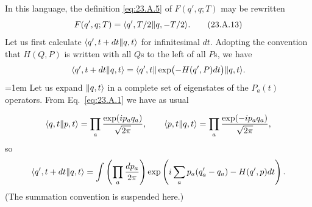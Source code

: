 In this language, the definition \eqref{eq:23.A.5} of $F(q',q;T)$ may be rewritten
\begin{equation}
 F(q',q;T)=\langle q',T/2\Vert q,-T/2\rangle.
 \tag{23.A.13}\label{eq:23.A.13}
\end{equation}
Let us first calculate $\langle q',t+dt\Vert q,t\rangle$ for infinitesimal $dt$. Adopting the convention that $H(Q,P)$ is written with all $Q$s to the left of all $P$s, we have
\[
 \langle q',t+dt\Vert q,t\rangle
 =\langle q',t\rVert\exp\bigl(-H(q',P)dt\bigr)\lVert q,t\rangle.
\]
\begingroup
\emergencystretch=1em
Let us expand $\lVert q,t\rangle$ in a complete set of eigenstates of the $P_a(t)$ operators. From Eq.~\eqref{eq:23.A.1} we have as usual
\par
\endgroup
\[
 \langle q,t\Vert p,t\rangle
 =\prod_a\frac{\exp(ip_aq_a)}{\sqrt{2\pi}},
 \qquad
 \langle p,t\Vert q,t\rangle
 =\prod_a\frac{\exp(-ip_aq_a)}{\sqrt{2\pi}},
\]
so
\[
 \langle q',t+dt\Vert q,t\rangle
 =\int\left(\prod_a\frac{dp_a}{2\pi}\right)
 \exp\left(
 i\sum_a p_a(q'_a-q_a)-H(q',p)dt
 \right).
\]
(The summation convention is suspended here.)

